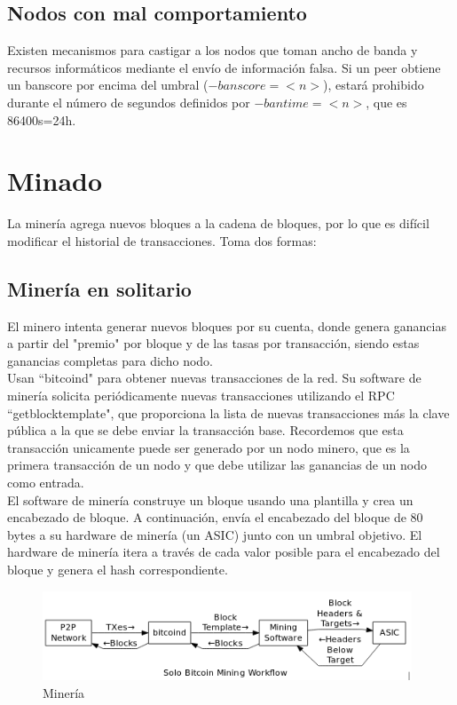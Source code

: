 \documentclass[11pt,a4paper]{article}
\begin{document}
\subsection{Nodos con mal comportamiento}

Existen mecanismos para castigar a los nodos que toman ancho de banda y recursos informáticos mediante el envío de información falsa. Si un peer obtiene un banscore por encima del umbral ($-banscore = <n>$), estará prohibido durante el número de segundos definidos por $-bantime = <n>$, que es 86400s=24h.

\section{Minado}

La minería agrega nuevos bloques a la cadena de bloques, por lo que es difícil modificar el historial de transacciones. Toma dos formas:

\subsection{Minería en solitario}

El minero intenta generar nuevos bloques por su cuenta, donde genera ganancias a partir del "premio" por bloque y de las tasas por transacción, siendo estas ganancias completas para dicho nodo.\\

Usan ``bitcoind" para obtener nuevas transacciones de la red. Su software de minería solicita periódicamente nuevas transacciones utilizando el RPC ``getblocktemplate", que proporciona la lista de nuevas transacciones más la clave pública a la que se debe enviar la transacción base. Recordemos que esta transacción unicamente puede ser generado por un nodo minero, que es la primera transacción de un nodo y que debe utilizar las ganancias de un nodo como entrada.\\

El software de minería construye un bloque usando una plantilla y crea un encabezado de bloque. A continuación, envía el encabezado del bloque de 80 bytes a su hardware de minería (un ASIC) junto con un umbral objetivo. El hardware de minería itera a través de cada valor posible para el encabezado del bloque y genera el hash correspondiente.\\

\begin{figure}[h]
	\includegraphics[width=11cm]{Image5.png}
	\centering		
	\caption{Minería}
	\label{p5}
\end{figure}
\end{document}
